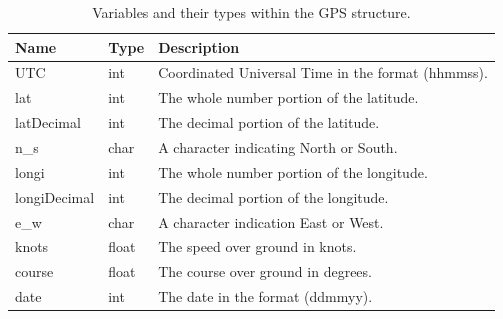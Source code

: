 \begin{table}[!hb]
	\begin{center}
		\caption{Variables and their types within the GPS structure.}
		\label{tab:3:GPSstruct}
		\begin{tabular}{|l|l|l|}
			\hline
			\textbf{Name} & \textbf{Type} & \textbf{Description} \\
			\hline
			UTC & int & Coordinated Universal Time in the format (hhmmss). \\
			\hline
			lat & int & The whole number portion of the latitude. \\
			\hline
			latDecimal & int & The decimal portion of the latitude. \\
			\hline
			n\_s & char & A character indicating North or South. \\
			\hline
			longi & int & The whole number portion of the longitude. \\
			\hline 
			longiDecimal & int & The decimal portion of the longitude. \\
			\hline 
			e\_w & char & A character indication East or West. \\
			\hline
			knots & float & The speed over ground in knots. \\
			\hline
			course & float & The course over ground in degrees. \\
			\hline
			date & int & The date in the format (ddmmyy). \\
			\hline
		\end{tabular}
	\end{center}
\end{table}
